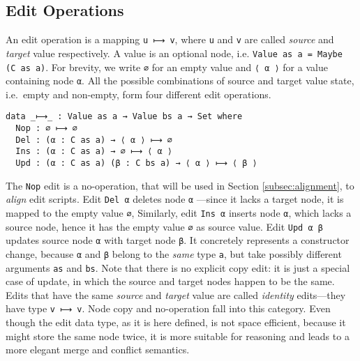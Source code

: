 \documentclass{sigplanconf}
\theoremstyle{plain}
\begin{document}
\subsection{Edit Operations}
An edit operation is a mapping \texttt{u ⟼ v}, where \texttt{u} and
\texttt{v} are called \emph{source} and \emph{target} value
respectively.
%
A value is an optional node, i.e.  \texttt{Value as a = Maybe (C as
  a)}. 
%
For brevity, we write \texttt{∅} for an empty value and \texttt{⟨ α ⟩}
for a value containing node \texttt{α}.
% 
All the possible combinations of source and target value state, i.e.\
empty and non-empty, form four different edit operations.
\begin{verbatim}
data _⟼_ : Value as a → Value bs a → Set where
  Nop : ∅ ⟼ ∅
  Del : (α : C as a) → ⟨ α ⟩ ⟼ ∅
  Ins : (α : C as a) → ∅ ⟼ ⟨ α ⟩
  Upd : (α : C as a) (β : C bs a) → ⟨ α ⟩ ⟼ ⟨ β ⟩
\end{verbatim}
The \texttt{Nop} edit is a no-operation, that will be
used in Section \ref{subsec:alignment}, to \emph{align} edit scripts.
%
Edit \texttt{Del α} deletes node \texttt{α} ---since it lacks a target
node, it is mapped to the empty value \texttt{∅},
%
Similarly, edit \texttt{Ins α} inserts node \texttt{α}, which
lacks a source node, hence it has the empty value \texttt{∅} 
as source value.
%
Edit \texttt{Upd α β} updates source node \texttt{α} with target node
\texttt{β}.
%
It concretely represents a constructor change, because \texttt{α} and
\texttt{β} belong to the \emph{same} type \texttt{a}, but take possibly
different arguments \texttt{as} and \texttt{bs}.
%
Note that there is no explicit copy edit: it is just a special case of
update, in which the source and target nodes happen to be the same.
%
Edits that have the same \emph{source} and \emph{target} value are
called \emph{identity} edits---they have type \texttt{v
  ⟼ v}.
%
Node copy and no-operation fall into this category.
%
Even though the edit data type, as it is here defined, is not space
efficient, because it might store the same node twice, it is more
suitable for reasoning and leads to a more elegant merge and conflict
semantics.
%
	
\end{document}
